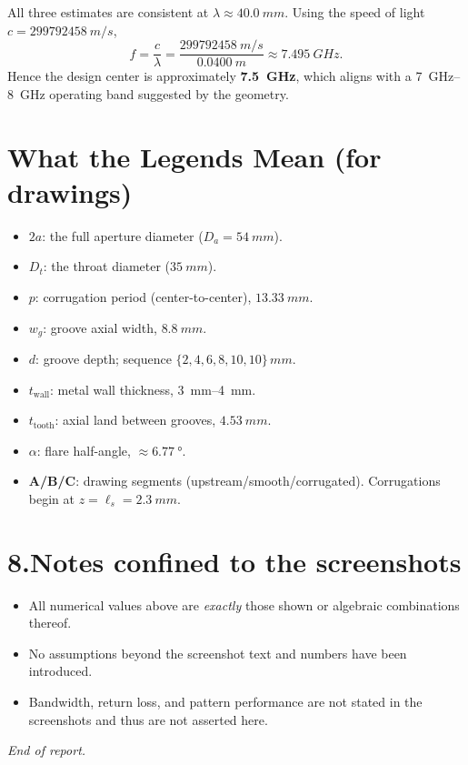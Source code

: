 \documentclass[11pt]{article}
\begin{document}
All three estimates are consistent at $\lambda \approx \SI{40.0}{mm}$. Using the speed of light $c=\SI{299792458}{m/s}$,
\begin{equation*}
f=\frac{c}{\lambda}=\frac{\SI{299792458}{m/s}}{\SI{0.0400}{m}} \approx \SI{7.495}{GHz}.
\end{equation*}
Hence the design center is approximately \textbf{\SI{7.5}{GHz}}, which aligns with a \SIrange{7}{8}{GHz} operating band suggested by the geometry.

\section*{What the Legends Mean (for drawings)}
\begin{itemize}[leftmargin=1.4em]
  \item \textbf{$2a$}: the full aperture diameter ($D_a=\SI{54}{mm}$).
  \item \textbf{$D_t$}: the throat diameter ($\SI{35}{mm}$).
  \item \textbf{$p$}: corrugation period (center-to-center), $\SI{13.33}{mm}$.
  \item \textbf{$w_g$}: groove axial width, $\SI{8.8}{mm}$.
  \item \textbf{$d$}: groove depth; sequence $\{2,4,6,8,10,10\}\,\si{mm}$.
  \item \textbf{$t_{\text{wall}}$}: metal wall thickness, \SIrange{3}{4}{mm}.
  \item \textbf{$t_{\text{tooth}}$}: axial land between grooves, $\SI{4.53}{mm}$.
  \item \textbf{$\alpha$}: flare half-angle, $\approx \SI{6.77}{\degree}$.
  \item \textbf{A/B/C}: drawing segments (upstream/smooth/corrugated). Corrugations begin at $z=\ell_s=\SI{2.3}{mm}$.
\end{itemize}

\section*{8.\quad Notes confined to the screenshots}
\begin{itemize}[leftmargin=1.4em]
  \item All numerical values above are \emph{exactly} those shown or algebraic combinations thereof.
  \item No assumptions beyond the screenshot text and numbers have been introduced.
  \item Bandwidth, return loss, and pattern performance are not stated in the screenshots and thus are not asserted here.
\end{itemize}

\bigskip
\noindent\textit{End of report.}
\end{document}
